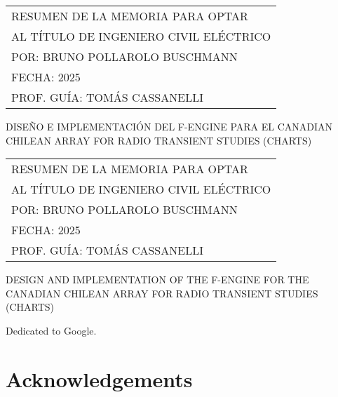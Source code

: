 \documentclass[
	12pt,
	letterpaper,
  oneside
  ]{book}
\makeatletter
\newenvironment{preliminary}{
  \pagestyle{plain}\pagenumbering{roman}
  }{\cleardoublepage\pagenumbering{arabic}}
\newenvironment{dedication}{
  \if@openright\cleardoublepage\else\clearpage\fi
  \vspace*{\stretch{1}}
  \itshape
  \raggedleft
  \begingroup
  }{\par\vspace{\stretch{3}}\endgroup\newpage}
\newenvironment{acknowledgements}{
  \if@openright\cleardoublepage\else\clearpage\fi
  \chapter*{Acknowledgements}
  \begingroup
  }{\par\endgroup\newpage}
\makeatother
\begin{document}
  \newpage
  
  \begin{preliminary}
  
  
  \setcounter{page}{1}

  \begin{tabular}{l}
		RESUMEN DE LA MEMORIA PARA OPTAR \\
		AL TÍTULO DE INGENIERO CIVIL ELÉCTRICO \\
		POR: \MakeUppercase{Bruno Pollarolo Buschmann} \\
		FECHA: 2025 \\
		PROF. GUÍA: TOMÁS CASSANELLI
	\end{tabular}

  \begin{center}
    \MakeUppercase{Diseño e implementación del F-engine para el Canadian Chilean Array for Radio Transient Studies (CHARTS)}
  \end{center}
  \lipsum[1-2]

  \newpage

  \begin{tabular}{l}
		RESUMEN DE LA MEMORIA PARA OPTAR \\
		AL TÍTULO DE INGENIERO CIVIL ELÉCTRICO \\
		POR: \MakeUppercase{Bruno Pollarolo Buschmann} \\
		FECHA: 2025 \\
		PROF. GUÍA: TOMÁS CASSANELLI
	\end{tabular}

  \begin{center}
    \MakeUppercase{Design and implementation of the F-engine for the Canadian Chilean Array for Radio Transient Studies (CHARTS)}
  \end{center}
  \lipsum[1-2]

  \newpage

  \begin{dedication}
    Dedicated to Google.
  \end{dedication}

  \newpage

  \begin{acknowledgements}
    \lipsum[1-2]
  \end{acknowledgements}

  \tableofcontents

  \listoftables

  \listoffigures

\end{preliminary}
\end{document}
